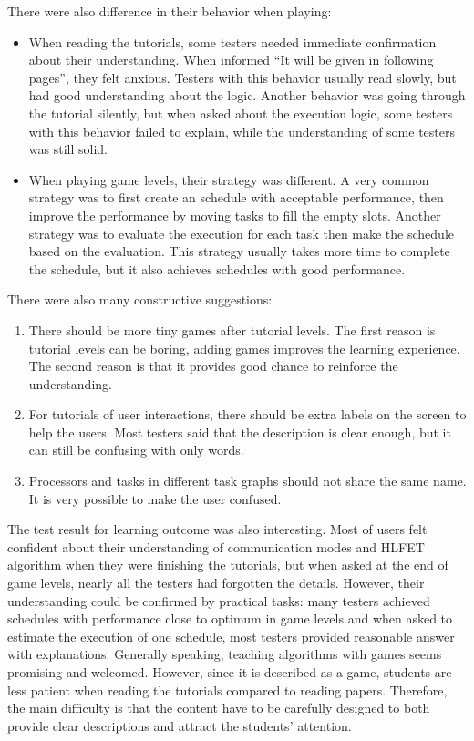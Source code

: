 \documentclass[msc,deptreport, cs]{infthesis}
\begin{document}
There were also difference in their behavior when playing:
\begin{itemize}
  \item When reading the tutorials, some testers needed immediate confirmation about their understanding. When informed ``It will be given in following pages'', they felt anxious. Testers with this behavior usually read slowly, but had good understanding about the logic. Another behavior was going through the tutorial silently, but when asked about the execution logic, some testers with this behavior failed to explain, while the understanding of some testers was still solid.
  \item When playing game levels, their strategy was different. A very common strategy was to first create an schedule with acceptable performance, then improve the performance by moving tasks to fill the empty slots. Another strategy was to evaluate the execution for each task then make the schedule based on the evaluation. This strategy usually takes more time to complete the schedule, but it also achieves schedules with good performance.
\end{itemize}

There were also many constructive suggestions:
\begin{enumerate}
  \item There should be more tiny games after tutorial levels. The first reason is tutorial levels can be boring, adding games improves the learning experience. The second reason is that it provides good chance to reinforce the understanding.
  \item For tutorials of user interactions, there should be extra labels on the screen to help the users. Most testers said that the description is clear enough, but it can still be confusing with only words.
  \item Processors and tasks in different task graphs should not share the same name. It is very possible to make the user confused.
\end{enumerate}

The test result for learning outcome was also interesting. Most of users felt confident about their understanding of communication modes and HLFET algorithm when they were finishing the tutorials, but when asked at the end of game levels, nearly all the testers had forgotten the details. However, their understanding could be confirmed by practical tasks: many testers achieved schedules with performance close to optimum in game levels and when asked to estimate the execution of one schedule, most testers provided reasonable answer with explanations. Generally speaking, teaching algorithms with games seems promising and welcomed. However, since it is described as a game, students are less patient when reading the tutorials compared to reading papers. Therefore, the main difficulty is that the content have to be carefully designed to both provide clear descriptions and attract the students' attention.
\end{document}
